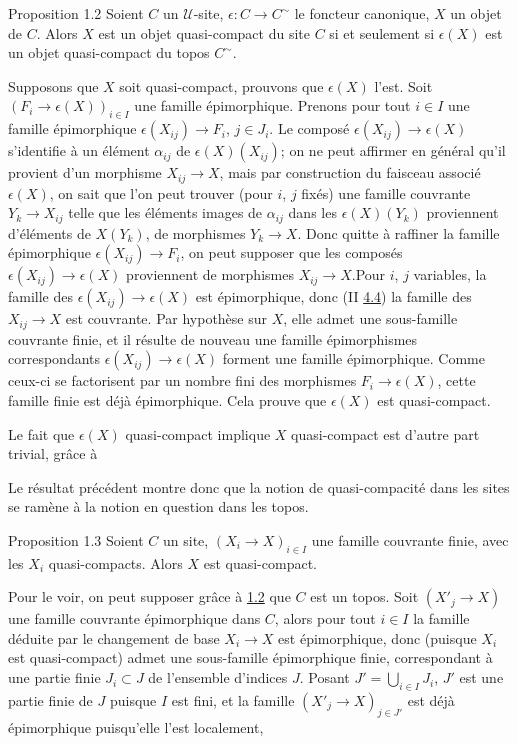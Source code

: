 \documentclass[10pt]{../fichiers-configuration-latex/smfart}
\begin{document}
\begin{enonce*}{Proposition 1.2}
Soient $C$ un $𝒰$-site, $\epsilon : C \to C^{\sim}$ le foncteur
canonique, $X$ un objet de $C$. Alors $X$ est un objet quasi-compact
du site $C$ si et seulement si $\epsilon(X)$ est un objet
quasi-compact du topos $C^{\sim}$.
\end{enonce*}

Supposons que $X$ soit quasi-compact, prouvons que $\epsilon(X)$
l'est. Soit $(F_i \to \epsilon(X))_{i \in I}$ une famille
épimorphique. Prenons pour tout $i \in I$ une famille épimorphique
$\epsilon(X_{ij}) \to F_i$, $j \in J_i$. Le composé $\epsilon(X_{ij})
\to \epsilon(X)$ s'identifie à un élément $\alpha_{ij}$ de
$\epsilon(X)(X_{ij})$; on ne peut affirmer en général qu'il provient
d'un morphisme $X_{ij} \to X$, mais par construction du faisceau
associé $\epsilon(X)$, on sait que l'on peut trouver (pour $i$, $j$
fixés) une famille couvrante $Y_k \to X_{ij}$ telle que les éléments
images de $\alpha_{ij}$ dans les $\epsilon(X)(Y_k)$ proviennent
d'éléments de $X(Y_k)$, \ie de morphismes $Y_k \to X$. Donc quitte à
raffiner la famille épimorphique $\epsilon(X_{ij}) \to F_i$, on peut
supposer que les composés $\epsilon(X_{ij}) \to \epsilon(X)$
proviennent de morphismes $X_{ij} \to X$.\pageoriginale Pour $i$, $j$
variables, la famille des $\epsilon(X_{ij}) \to \epsilon(X)$ est épimorphique, donc
(II \hyperref[VI.cor4.4]{4.4}) la famille des $X_{ij} \to X$ est couvrante. Par hypothèse sur
$X$, elle admet une sous-famille couvrante finie, et il résulte de
nouveau une famille épimorphismes correspondants $\epsilon(X_{ij}) \to
\epsilon(X)$ forment une famille épimorphique. Comme ceux-ci se
factorisent par un nombre fini des morphismes $F_i \to \epsilon(X)$,
cette famille finie est déjà épimorphique. Cela prouve que
$\epsilon(X)$ est quasi-compact.

Le fait que $\epsilon(X)$ quasi-compact implique $X$ quasi-compact est
d'autre part trivial, grâce à \loccit

Le résultat précédent montre donc que la notion de quasi-compacité
dans les sites se ramène à la notion en question dans les topos.

\begin{enonce*}{Proposition 1.3}
Soient $C$ un site, $(X_i \to X)_{i \in I}$ une famille couvrante
finie, avec les $X_i$ quasi-compacts. Alors $X$ est quasi-compact.
\end{enonce*}

Pour le voir, on peut supposer grâce à \hyperref[VI.prop1.2]{1.2} que $C$ est
un topos. Soit $(X'_j \to X)$ une famille couvrante \ie épimorphique
dans $C$, alors pour tout $i \in I$ la famille déduite par le
changement de base $X_{i} \to X$ est épimorphique, donc (puisque
$X_i$ est quasi-compact) admet une sous-famille épimorphique finie,
correspondant à une partie finie $J_i \subset J$ de l'ensemble
d'indices $J$. Posant $J'= \bigcup_{i\in I} J_i$, $J'$ est une
partie finie de $J$ puisque $I$ est fini, et la famille $(X'_j \to
X)_{j \in {J'}}$ est déjà épimorphique puisqu'elle l'est localement,
\cqfd
\end{document}
